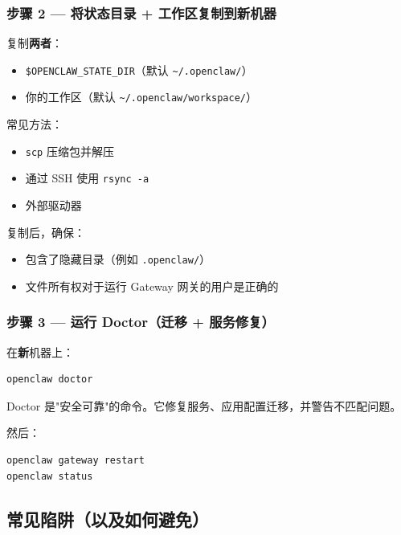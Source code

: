\subsubsection{步骤 2 — 将状态目录 + 工作区复制到新机器}


复制\textbf{两者}：

\begin{itemize}
  \item \texttt{\$OPENCLAW\_STATE\_DIR}（默认 \texttt{\textasciitilde{}/.openclaw/}）
  \item 你的工作区（默认 \texttt{\textasciitilde{}/.openclaw/workspace/}）
\end{itemize}


常见方法：

\begin{itemize}
  \item \texttt{scp} 压缩包并解压
  \item 通过 SSH 使用 \texttt{rsync -a}
  \item 外部驱动器
\end{itemize}


复制后，确保：

\begin{itemize}
  \item 包含了隐藏目录（例如 \texttt{.openclaw/}）
  \item 文件所有权对于运行 Gateway 网关的用户是正确的
\end{itemize}


\subsubsection{步骤 3 — 运行 Doctor（迁移 + 服务修复）}


在\textbf{新}机器上：

\begin{lstlisting}[language=bash]
openclaw doctor
\end{lstlisting}


Doctor 是"安全可靠"的命令。它修复服务、应用配置迁移，并警告不匹配问题。

然后：

\begin{lstlisting}[language=bash]
openclaw gateway restart
openclaw status
\end{lstlisting}


\subsection{常见陷阱（以及如何避免）}


